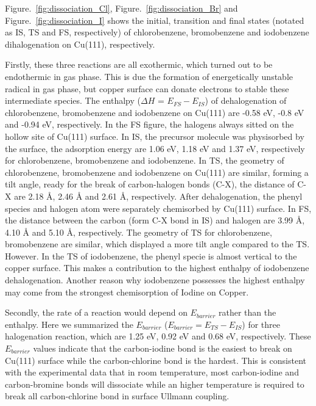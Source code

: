 \documentclass[aps,reprint,amsmath,amssymb]{revtex4-2}
\begin{document}
Figure.~\ref{fig:dissociation_Cl}, Figure.~\ref{fig:dissociation_Br} and Figure.~\ref{fig:dissociation_I} shows the initial, transition and final states (notated as IS, TS and FS, respectively) of chlorobenzene, bromobenzene and iodobenzene dihalogenation on Cu(111), respectively. 

Firstly, these three reactions are all exothermic, which turned out to be endothermic in gas phase. This is due the formation of energetically unstable radical in gas phase, but copper surface can donate electrons to stable these intermediate species. The enthalpy ($\Delta H$ = $E_{FS} - E_{IS}$) of dehalogenation of chlorobenzene, bromobenzene and iodobenzene on Cu(111) are -0.58 eV, -0.8 eV and -0.94 eV, respectively. In the FS figure, the halogens always sitted on the hollow site of Cu(111) surface. In IS, the precursor molecule was physisorbed by the surface, the adsorption energy are 1.06 eV, 1.18 eV and 1.37 eV, respectively for chlorobenzene, bromobenzene and iodobenzene. In TS, the geometry of chlorobenzene, bromobenzene and iodobenzene on Cu(111) are similar, forming a tilt angle, ready for the break of carbon-halogen bonds (C-X), the distance of C-X are 2.18 \si{\angstrom}, 2.46 \si{\angstrom} and 2.61 \si{\angstrom}, respectively. After dehalogenation, the phenyl species and halogen atom were separately chemisorbed by Cu(111) surface. In FS, the distance between the carbon (form C-X bond in IS) and halogen are 3.99 \si{\angstrom}, 4.10 \si{\angstrom} and 5.10 \si{\angstrom}, respectively. The geometry of TS for chlorobenzene, bromobenzene are similar, which displayed a more tilt angle compared to the TS. However. In the TS of iodobenzene, the phenyl specie is almost vertical to the copper surface. This makes a contribution to the highest enthalpy of iodobenzene dehalogenation. Another reason why iodobenzene possesses the highest enthalpy may come from the strongest chemisorption of Iodine on Copper. 

Secondly, the rate of a reaction would depend on $E_{barrier}$ rather than the enthalpy. Here we summarized the $E_{barrier}$ ($E_{barrier} = E_{TS} - E_{IS}$) for three halogenation reaction, which are 1.25 eV, 0.92 eV and 0.68 eV, respectively. These $E_{barrier}$ values indicate that the carbon-iodine bond is the easiest to break on Cu(111) surface while the carbon-chlorine bond is the hardest. This is consistent with the experimental data that in room temperature, most carbon-iodine and carbon-bromine bonds will dissociate while an higher temperature is required to break all carbon-chlorine bond in surface Ullmann coupling.
\end{document}
